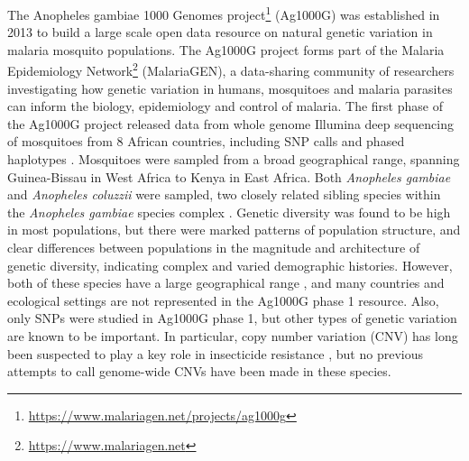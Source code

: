 \documentclass[a4paper,11pt,abstracton,hidelinks]{scrartcl}
\begin{document}
%
The Anopheles gambiae 1000 Genomes project\footnote{\url{https://www.malariagen.net/projects/ag1000g}} (Ag1000G) was established in 2013 to build a large scale open data resource on natural genetic variation in malaria mosquito populations.
%
The Ag1000G project forms part of the Malaria Epidemiology Network\footnote{\url{https://www.malariagen.net}} (MalariaGEN), a data-sharing community of researchers investigating how genetic variation in humans, mosquitoes and malaria parasites can inform the biology, epidemiology and control of malaria.
%
The first phase of the Ag1000G project released data from whole genome Illumina deep sequencing of mosquitoes from 8 African countries, including SNP calls and phased haplotypes \cite{Ag1000G2017}.
%
Mosquitoes were sampled from a broad geographical range, spanning Guinea-Bissau in West Africa to Kenya in East Africa.
%
Both \textit{Anopheles gambiae} and \textit{Anopheles coluzzii} were sampled, two closely related sibling species within the \textit{Anopheles gambiae} species complex \cite{coetzee2013}.
%
Genetic diversity was found to be high in most populations, but there were marked patterns of population structure, and clear differences between populations in the magnitude and architecture of genetic diversity, indicating complex and varied demographic histories.
%
However, both of these species have a large geographical range \cite{wiebe2017}, and many countries and ecological settings are not represented in the Ag1000G phase 1 resource.
%
Also, only SNPs were studied in Ag1000G phase 1, but other types of genetic variation are known to be important.
%
In particular, copy number variation (CNV) has long been suspected to play a key role in insecticide resistance \cite{schimke1978, devonshire1991, weetman2015}, but no previous attempts to call genome-wide CNVs have been made in these species.
\end{document}
